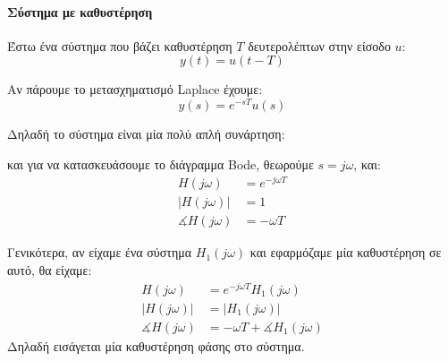 \documentclass[11pt,a4paper,notitlepage,fleqn,final]{article}
\begin{document}
\paragraph{Σύστημα με καθυστέρηση}
Έστω ένα σύστημα που βάζει καθυστέρηση \( T \) δευτερολέπτων
στην είσοδο \( u \):
\[
y(t) = u(t-T)
\]

Αν πάρουμε το μετασχηματισμό Laplace έχουμε:
\[
y(s) = e^{-sT} u(s)
\]

Δηλαδή το σύστημα είναι μία πολύ απλή συνάρτηση:


και για να κατασκευάσουμε το διάγραμμα Bode, θεωρούμε \( s=j\omega \),
και:
\begin{align*}
	H(j\omega) &= e^{-j\omega T}
	\\
	\left\lvert H(j\omega) \right\rvert &= 1 \\
	\measuredangle H(j\omega) &= - \omega T
\end{align*}

Γενικότερα, αν είχαμε ένα σύστημα \( H_1(j\omega) \) και εφαρμόζαμε
μία καθυστέρηση σε αυτό, θα είχαμε:
\begin{align*}
	H(j\omega) &= e^{-j\omega T} H_1(j\omega) \\
	\left\lvert H(j\omega) \right\rvert &= \left\lvert H_1(j\omega)
	\right\rvert \\
	\measuredangle H(j\omega) &= -\omega T + \measuredangle H_1(j\omega)
\end{align*}
Δηλαδή εισάγεται μία καθυστέρηση φάσης στο σύστημα.
\end{document}
